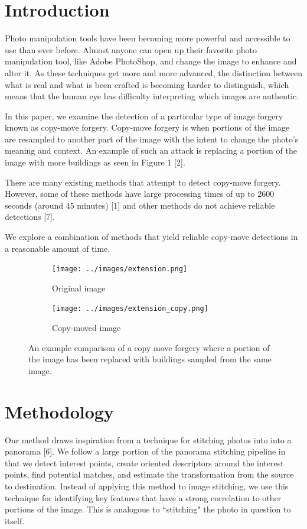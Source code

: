 \documentclass[12pt]{article}
\begin{document}
\section*{Introduction}
Photo manipulation tools have been becoming more powerful and accessible to use than ever before. Almost anyone can open up their favorite photo manipulation tool, like Adobe PhotoShop, and change the image to enhance and alter it. As these techniques get more and more advanced, the distinction between what is real and what is been crafted is becoming harder to distinguish, which means that the human eye has difficulty interpreting which images are authentic.

In this paper, we examine the detection of a particular type of image forgery known as copy-move forgery. Copy-move forgery is when portions of the image are resampled to another part of the image with the intent to change the photo's meaning and context. An example of such an attack is replacing a portion of the image with more buildings as seen in Figure 1 [2].

There are many existing methods that attempt to detect copy-move forgery. However, some of these methods have large processing times of up to 2600 seconds (around 45 minutes) [1] and other methods do not achieve reliable detections [7].

We explore a combination of methods that yield reliable copy-move detections in a reasonable amount of time.


\begin{figure}
\centering
\begin{subfigure}{.5\textwidth}
  \centering
  \texttt{[image: ../images/extension.png]}
  \caption{Original image}
  \label{fig:sub1}
\end{subfigure}%
\begin{subfigure}{.5\textwidth}
  \centering
  \texttt{[image: ../images/extension\_copy.png]}
  \caption{Copy-moved image}
  \label{fig:sub2}
\end{subfigure}
\caption{An example comparison of a copy move forgery where a portion of the image has been replaced with buildings sampled from the same image.}
\label{fig:test}
\end{figure}


\section*{Methodology}
Our method draws inspiration from a technique for stitching photos into into a panorama [6]. We follow a large portion of the panorama stitching pipeline in that we detect interest points, create oriented descriptors around the interest points, find potential matches, and estimate the transformation from the source to destination. Instead of applying this method to image stitching, we use this technique for identifying key features that have a strong correlation to other portions of the image. This is analogous to ``stitching" the photo in question to itself.
\end{document}
